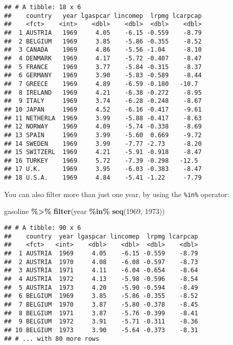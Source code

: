 \documentclass[
]{article}
\newenvironment{Shaded}{\begin{snugshade}}{\end{snugshade}}
\newcommand{\DecValTok}[1]{\textcolor[rgb]{0.00,0.00,0.81}{#1}}
\newcommand{\KeywordTok}[1]{\textcolor[rgb]{0.13,0.29,0.53}{\textbf{#1}}}
\newcommand{\NormalTok}[1]{#1}
\newcommand{\OperatorTok}[1]{\textcolor[rgb]{0.81,0.36,0.00}{\textbf{#1}}}
\newcommand{\StringTok}[1]{\textcolor[rgb]{0.31,0.60,0.02}{#1}}
\begin{document}
\begin{verbatim}
## # A tibble: 18 x 6
##    country   year lgaspcar lincomep  lrpmg lcarpcap
##    <fct>    <int>    <dbl>    <dbl>  <dbl>    <dbl>
##  1 AUSTRIA   1969     4.05    -6.15 -0.559    -8.79
##  2 BELGIUM   1969     3.85    -5.86 -0.355    -8.52
##  3 CANADA    1969     4.86    -5.56 -1.04     -8.10
##  4 DENMARK   1969     4.17    -5.72 -0.407    -8.47
##  5 FRANCE    1969     3.77    -5.84 -0.315    -8.37
##  6 GERMANY   1969     3.90    -5.83 -0.589    -8.44
##  7 GREECE    1969     4.89    -6.59 -0.180   -10.7 
##  8 IRELAND   1969     4.21    -6.38 -0.272    -8.95
##  9 ITALY     1969     3.74    -6.28 -0.248    -8.67
## 10 JAPAN     1969     4.52    -6.16 -0.417    -9.61
## 11 NETHERLA  1969     3.99    -5.88 -0.417    -8.63
## 12 NORWAY    1969     4.09    -5.74 -0.338    -8.69
## 13 SPAIN     1969     3.99    -5.60  0.669    -9.72
## 14 SWEDEN    1969     3.99    -7.77 -2.73     -8.20
## 15 SWITZERL  1969     4.21    -5.91 -0.918    -8.47
## 16 TURKEY    1969     5.72    -7.39 -0.298   -12.5 
## 17 U.K.      1969     3.95    -6.03 -0.383    -8.47
## 18 U.S.A.    1969     4.84    -5.41 -1.22     -7.79
\end{verbatim}

You can also filter more than just one year, by using the \texttt{\%in\%} operator:

\begin{Shaded}
\begin{Highlighting}[]
\NormalTok{gasoline }\OperatorTok{\%\textgreater{}\%}\StringTok{ }\KeywordTok{filter}\NormalTok{(year }\OperatorTok{\%in\%}\StringTok{ }\KeywordTok{seq}\NormalTok{(}\DecValTok{1969}\NormalTok{, }\DecValTok{1973}\NormalTok{))}
\end{Highlighting}
\end{Shaded}

\begin{verbatim}
## # A tibble: 90 x 6
##    country  year lgaspcar lincomep  lrpmg lcarpcap
##    <fct>   <int>    <dbl>    <dbl>  <dbl>    <dbl>
##  1 AUSTRIA  1969     4.05    -6.15 -0.559    -8.79
##  2 AUSTRIA  1970     4.08    -6.08 -0.597    -8.73
##  3 AUSTRIA  1971     4.11    -6.04 -0.654    -8.64
##  4 AUSTRIA  1972     4.13    -5.98 -0.596    -8.54
##  5 AUSTRIA  1973     4.20    -5.90 -0.594    -8.49
##  6 BELGIUM  1969     3.85    -5.86 -0.355    -8.52
##  7 BELGIUM  1970     3.87    -5.80 -0.378    -8.45
##  8 BELGIUM  1971     3.87    -5.76 -0.399    -8.41
##  9 BELGIUM  1972     3.91    -5.71 -0.311    -8.36
## 10 BELGIUM  1973     3.90    -5.64 -0.373    -8.31
## # ... with 80 more rows
\end{verbatim}
\end{document}
